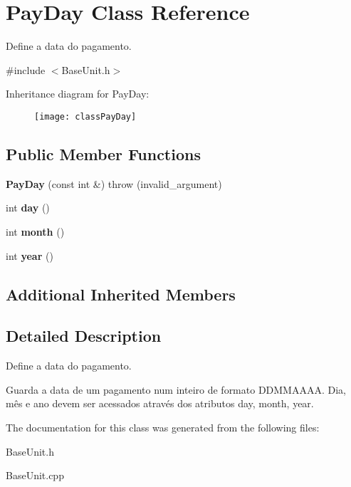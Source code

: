 \hypertarget{classPayDay}{\section{Pay\-Day Class Reference}
\label{classPayDay}
}


Define a data do pagamento.  




{\ttfamily \#include $<$Base\-Unit.\-h$>$}

Inheritance diagram for Pay\-Day\-:\begin{figure}[H]
\begin{center}
\leavevmode
\texttt{[image: classPayDay]}
\end{center}
\end{figure}
\subsection*{Public Member Functions}
\begin{DoxyCompactItemize}
\item 
\hypertarget{classPayDay_aa11abdfdb58bbd93f68bc02a7496e1c4}{{\bfseries Pay\-Day} (const int \&)  throw (invalid\-\_\-argument)}\label{classPayDay_aa11abdfdb58bbd93f68bc02a7496e1c4}

\item 
\hypertarget{classPayDay_a297ce892f49aa9f3a504d514f171ed1d}{int {\bfseries day} ()}\label{classPayDay_a297ce892f49aa9f3a504d514f171ed1d}

\item 
\hypertarget{classPayDay_ada65e8834c142a95cd35ca2b399fbcde}{int {\bfseries month} ()}\label{classPayDay_ada65e8834c142a95cd35ca2b399fbcde}

\item 
\hypertarget{classPayDay_a962960925f9e6eaaac0fef5eb96849ec}{int {\bfseries year} ()}\label{classPayDay_a962960925f9e6eaaac0fef5eb96849ec}

\end{DoxyCompactItemize}
\subsection*{Additional Inherited Members}


\subsection{Detailed Description}
Define a data do pagamento. 

Guarda a data de um pagamento num inteiro de formato D\-D\-M\-M\-A\-A\-A\-A. Dia, mês e ano devem ser acessados através dos atributos day, month, year. 

The documentation for this class was generated from the following files\-:\begin{DoxyCompactItemize}
\item 
Base\-Unit.\-h\item 
Base\-Unit.\-cpp\end{DoxyCompactItemize}
